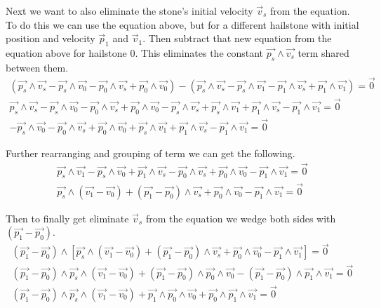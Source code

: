 \documentclass[11pt]{article}
\begin{document}
Next we want to also eliminate the stone's initial velocity $\vec{v}_s$ from the equation. To do this
we can use the equation above, but for a different hailstone with initial position and velocity $\vec{p}_1$
and $\vec{v}_1$. Then subtract that new equation from the equation above for hailstone 0. This eliminates
the constant $\vec{p_s} \wedge \vec{v_s}$ term shared between them.
\begin{gather*}
    (\vec{p_s} \wedge \vec{v_s} - \vec{p_s} \wedge \vec{v_0} - \vec{p_0} \wedge \vec{v_s} + \vec{p_0} \wedge \vec{v_0}) - (\vec{p_s} \wedge \vec{v_s} - \vec{p_s} \wedge \vec{v_1} - \vec{p_1} \wedge \vec{v_s} + \vec{p_1} \wedge \vec{v_1}) = \vec{0} \\
    \vec{p_s} \wedge \vec{v_s} - \vec{p_s} \wedge \vec{v_0} - \vec{p_0} \wedge \vec{v_s} + \vec{p_0} \wedge \vec{v_0} - \vec{p_s} \wedge \vec{v_s} + \vec{p_s} \wedge \vec{v_1} + \vec{p_1} \wedge \vec{v_s} - \vec{p_1} \wedge \vec{v_1} = \vec{0} \\
    - \vec{p_s} \wedge \vec{v_0} - \vec{p_0} \wedge \vec{v_s} + \vec{p_0} \wedge \vec{v_0} + \vec{p_s} \wedge \vec{v_1} + \vec{p_1} \wedge \vec{v_s} - \vec{p_1} \wedge \vec{v_1} = \vec{0}
\end{gather*}

Further rearranging and grouping of term we can get the following.
\begin{gather*}
    \vec{p_s} \wedge \vec{v_1} - \vec{p_s} \wedge \vec{v_0} + \vec{p_1} \wedge \vec{v_s} - \vec{p_0} \wedge \vec{v_s} + \vec{p_0} \wedge \vec{v_0} - \vec{p_1} \wedge \vec{v_1} = \vec{0} \\
    \vec{p_s} \wedge (\vec{v_1} - \vec{v_0}) + (\vec{p_1} - \vec{p_0}) \wedge \vec{v_s} + \vec{p_0} \wedge \vec{v_0} - \vec{p_1} \wedge \vec{v_1} = \vec{0}
\end{gather*}

Then to finally get eliminate $\vec{v}_s$ from the equation we wedge both sides with
$(\vec{p_1} - \vec{p_0})$. 
\begin{gather*}
    (\vec{p_1} - \vec{p_0}) \wedge [\vec{p_s} \wedge (\vec{v_1} - \vec{v_0}) + (\vec{p_1} - \vec{p_0}) \wedge \vec{v_s} + \vec{p_0} \wedge \vec{v_0} - \vec{p_1} \wedge \vec{v_1}] = \vec{0} \\
    (\vec{p_1} - \vec{p_0}) \wedge \vec{p_s} \wedge (\vec{v_1} - \vec{v_0}) +  (\vec{p_1} - \vec{p_0}) \wedge \vec{p_0} \wedge \vec{v_0} -  (\vec{p_1} - \vec{p_0}) \wedge \vec{p_1} \wedge \vec{v_1} = \vec{0} \\
    (\vec{p_1} - \vec{p_0}) \wedge \vec{p_s} \wedge (\vec{v_1} - \vec{v_0}) +  \vec{p_1} \wedge \vec{p_0} \wedge \vec{v_0} + \vec{p_0} \wedge \vec{p_1} \wedge \vec{v_1} = \vec{0}
\end{gather*}
\end{document}
